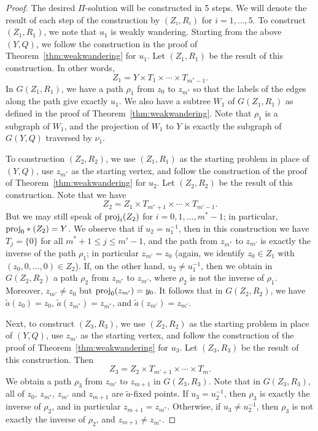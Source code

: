 \documentclass[11pt]{amsart}
\theoremstyle{definition}
\theoremstyle{definition}
\numberwithin{equation}{section}
\begin{document}
\begin{proof}
The desired $\Pi$-solution will be constructed in 5 steps. We will denote the result of each step of the construction by $(Z_i, R_i)$ for $i=1,\dots, 5$. To construct $(Z_1, R_1)$, we note that $u_1$ is weakly wandering. Starting from the above $(Y, Q)$, we follow the construction in the proof of Theorem~\ref{thm:weakwandering} for $u_1$. Let $(Z_1, R_1)$ be the result of this construction. In other words, 
$$ Z_1=Y\times T_1\times\cdots \times T_{m^*-1}. $$
In $G(Z_1, R_1)$, we have a path $\rho_1$ from $z_0$ to $z_{m^*}$ so that the labels of the edges along the path give exactly $u_1$. We also have a subtree $W_1$ of $G(Z_1, R_1)$ as defined in the proof of Theorem~\ref{thm:weakwandering}. Note that $\rho_1$ is a subgraph of $W_1$, and the projection of $W_1$ to $Y$ is exactly the subgraph of $G(Y,Q)$ traversed by $\nu_1$. 

To construction $(Z_2, R_2)$, we use $(Z_1, R_1)$ as the starting problem in place of $(Y, Q)$, use $z_{m^*}$ as the starting vertex, and follow the construction of the proof of Theorem~\ref{thm:weakwandering} for $u_2$. Let $(Z_2, R_2)$ be the result of this construction. Note that we have
$$ Z_2=Z_1\times T_{m^*+1}\times \cdots \times T_{m'-1}. $$
But we may still speak of $\mbox{\rm proj}_i(Z_2)$ for $i=0,1,\dots, m^*-1$; in particular, $\mbox{\rm proj}_0*(Z_2)=Y$. We observe that if $u_2=u_1^{-1}$, then in this construction we have $T_j=\{0\}$ for all $m^*+1\leq j\leq m'-1$, and the path from $z_{m^*}$ to $z_{m'}$ is exactly the inverse of the path $\rho_1$; in particular $z_{m'}=z_0$ (again, we identify $z_0\in Z_1$ with $(z_0, 0, \dots, 0)\in Z_2$). If, on the other hand, $u_2\neq u_1^{-1}$, then we obtain in $G(Z_2, R_2)$ a path $\rho_2$ from $z_{m^*}$ to $z_{m'}$, where $\rho_2$ is not the inverse of $\rho_1$. Moreover, $z_{m'}\neq z_0$ but $\mbox{\rm proj}_0(z_{m'})=y_0$. It follows that in $G(Z_2, R_2)$, we have $\tilde{a}(z_0)=z_0$, $\tilde{a}(z_{m^*})=z_{m^*}$, and $\tilde{a}(z_{m'})=z_{m'}$.

Next, to construct $(Z_3, R_3)$, we use $(Z_2, R_2)$ as the starting problem in place of $(Y, Q)$, use $z_{m'}$ as the starting vertex, and follow the construction of the proof of Theorem~\ref{thm:weakwandering} for $u_3$. Let $(Z_3, R_3)$ be the result of this construction. Then 
$$ Z_3=Z_2\times T_{m'+1}\times\cdots\times T_{m}. $$
We obtain a path $\rho_3$ from $z_{m'}$ to $z_{m+1}$ in $G(Z_3, R_3)$. Note that in $G(Z_3, R_3)$, all of $z_0$, $z_{m^*}$, $z_{m'}$ and $z_{m+1}$ are $\tilde{a}$-fixed points. If $u_3=u_2^{-1}$, then $\rho_3$ is exactly the inverse of $\rho_2$, and in particular $z_{m+1}=z_{m^*}$. Otherwise, if $u_3\neq u_2^{-1}$, then $\rho_3$ is not exactly the inverse of $\rho_2$, and $z_{m+1}\neq z_{m^*}$.


\end{proof}
\end{document}
